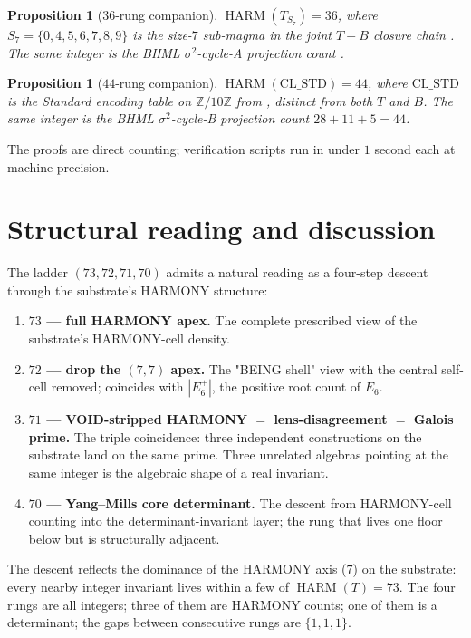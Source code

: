 \documentclass[11pt,reqno]{amsart}
\newtheorem{proposition}[theorem]{Proposition}
\theoremstyle{definition}
\newcommand{\Z}{\mathbb{Z}}
\DeclareMathOperator{\HARM}{HARM}
\begin{document}
\begin{proposition}[$36$-rung companion]
\label{prop:36}
$\HARM(T_{S_7}) = 36$, where $S_7 = \{0, 4, 5, 6, 7, 8, 9\}$ is the
size-$7$ sub-magma in the joint $T+B$ closure chain
\cite{Sanders2026FourCore}. The same integer is the BHML
$\sigma^2$-cycle-A projection count
\cite{Sanders2026LensInvariance}.
\end{proposition}

\begin{proposition}[$44$-rung companion]
\label{prop:44}
$\HARM(\mathrm{CL\_STD}) = 44$, where $\mathrm{CL\_STD}$ is the
Standard encoding table on $\Z/10\Z$ from
\cite{Sanders2026LensInvariance}, distinct from both $T$ and $B$.
The same integer is the BHML $\sigma^2$-cycle-B projection count
$28 + 11 + 5 = 44$.
\end{proposition}

The proofs are direct counting; verification scripts run in under
$1$ second each at machine precision.

\section{Structural reading and discussion}
\label{sec:reading}

The ladder $(73, 72, 71, 70)$ admits a natural reading as a four-step
descent through the substrate's HARMONY structure:

\begin{enumerate}[label=(\arabic*),leftmargin=*]
\item \textbf{$73$ — full HARMONY apex.} The complete prescribed view
  of the substrate's HARMONY-cell density.
\item \textbf{$72$ — drop the $(7,7)$ apex.} The "BEING shell" view
  with the central self-cell removed; coincides with $|E_6^+|$, the
  positive root count of $E_6$.
\item \textbf{$71$ — VOID-stripped HARMONY $=$ lens-disagreement $=$
  Galois prime.} The triple coincidence: three independent
  constructions on the substrate land on the same prime. Three
  unrelated algebras pointing at the same integer is the algebraic
  shape of a real invariant.
\item \textbf{$70$ — Yang--Mills core determinant.} The descent from
  HARMONY-cell counting into the determinant-invariant layer; the
  rung that lives one floor below but is structurally adjacent.
\end{enumerate}

The descent reflects the dominance of the HARMONY axis ($7$) on the
substrate: every nearby integer invariant lives within a few of
$\HARM(T) = 73$. The four rungs are all integers; three of them are
HARMONY counts; one of them is a determinant; the gaps between
consecutive rungs are $\{1, 1, 1\}$.
\end{document}

